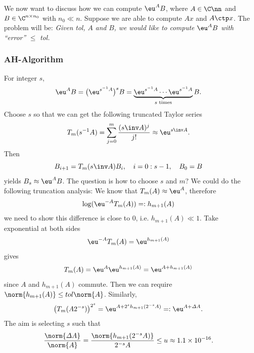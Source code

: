 \documentclass{article}
\begin{document}
We now want to discuss how we can compute $\eu^AB$, where $A\in\C\nn$
and $B \in \C^{n\times n_0}$ with $n_0 \ll n$. Suppose we are able to
compute $Ax$ and $A\ctp x$. The problem will be: \emph{Given tol, $A$
and $B$, we would like to compute $\eu^AB$ with ``error'' $\leq$ tol.}

\subsubsection{AH-Algorithm}

For integer $s$, 
\begin{equation}\notag
    \eu^A B = \big( \eu^{s^{-1}A} \big)^s B = \underbrace{\eu^{s^{-1}A}\cdots \eu^{s^{-1}A} }_{\text{$s$ times}} B.
\end{equation}
Choose $s$ so that we can get the following truncated Taylor series
\begin{equation}\notag
    T_m(s^{-1}A)=\sum_{j=0}^m\frac{(s\inv A)^j}{j!} \approx \eu^{s\inv A}. 
\end{equation}
Then 
\begin{equation}\notag
    B_{i+1} = T_m(s\inv A)B_i,\quad i = 0:s-1,\quad B_0 = B
\end{equation}
yields $B_s \approx \eu^AB$. The question is how to choose $s$ and $m$?
We could do the following truncation analysis: We know that $T_m(A)
\approx \eu^A$, therefore 
\begin{equation}\notag
    \log(\eu^{-A}T_m(A)) =: h_{m+1}(A)
\end{equation}
we need to show this difference is close to $0$, i.e. $h_{m+1}(A) \ll
1$. Take exponential at both sides 
\begin{equation}\notag
    \eu^{-A}T_m(A) = \eu^{h_{m+1}(A)} 
\end{equation}
gives 
\begin{equation}\notag
    T_m(A) = \eu^A\eu^{h_{m+1}(A)} = \eu^{A + h_{m+1}(A)}
\end{equation}
since $A$ and $h_{m+1}(A)$ commute. Then we can require
$\norm{h_{m+1}(A)} \leq tol \norm{A}$. Similarly, 
\begin{equation}\notag
    \left(T_m(A2^{-s})\right)^{2^s} = \eu^{A + 2^sh_{m+1}(2^{-s}A)} =:\eu^{A+\varDelta A}.
\end{equation}
The aim is selecting $s$ such that 
\begin{equation}\notag
    \frac{\norm{\varDelta A}}{\norm{A}} = \frac{\norm{h_{m+1}(2^{-s}A)}}{2^{-s}A} \leq u \approx 1.1\times 10^{-16}.
\end{equation}
\end{document}
